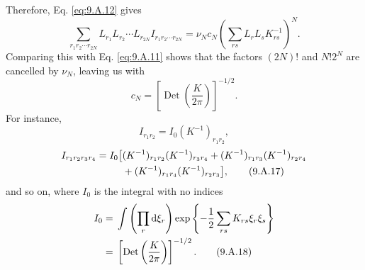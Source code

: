 Therefore, Eq. \eqref{eq:9.A.12} gives
\begin{equation}
  \sum_{r_1r_2\cdots r_{2N}}L_{r_1}L_{r_2}\cdots L_{r_{2N}}
  I_{r_1r_2\cdots r_{2N}}
  =\nu_Nc_N\left(\sum_{rs}L_rL_sK^{-1}_{rs}\right)^N.
  \tag{9.A.14}\label{eq:9.A.14}
\end{equation}
Comparing this with Eq. \eqref{eq:9.A.11} shows that the factors $(2N)!$ and
$N!2^N$ are cancelled by $\nu_N$, leaving us with
\begin{equation}
  c_N=\left[\operatorname{Det}\left(\frac{K}{2\pi}\right)\right]^{-1/2}.
  \tag{9.A.15}\label{eq:9.A.15}
\end{equation}
For instance,
\begin{equation}
  I_{r_1r_2}=I_0(K^{-1})_{r_1r_2},
  \tag{9.A.16}\label{eq:9.A.16}
\end{equation}
\begin{align}
  I_{r_1r_2r_3r_4}=I_0\bigl[{}&(K^{-1})_{r_1r_2}(K^{-1})_{r_3r_4}
  +(K^{-1})_{r_1r_3}(K^{-1})_{r_2r_4}
  \notag\\
  &+(K^{-1})_{r_1r_4}(K^{-1})_{r_2r_3}\bigr],
  \tag{9.A.17}\label{eq:9.A.17}
\end{align}
and so on, where $I_0$ is the integral with no indices
\begin{align}
  I_0
  &={}\int\left(\prod_r \mathop{}\!\mathrm{d}\xi_r\right)
  \exp\left\{-\frac{1}{2}\sum_{rs}K_{rs}\xi_r\xi_s\right\}
  \notag\\
  &={}\left[\operatorname{Det}\left(\frac{K}{2\pi}\right)\right]^{-1/2}.
  \tag{9.A.18}\label{eq:9.A.18}
\end{align}
